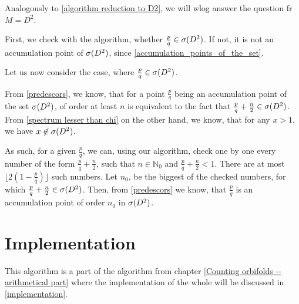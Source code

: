 Analogously to \ref{algorithm reduction to D2}, we will wlog answer the question fr $ M = D^2$. 

First, we check with the algorithm, whether $\frac{p}{q} \in {{\sigma}(D^2)}$. If not, it is not 
an accumulation point of ${{\sigma}(D^2)}$, since \ref{accumulation_points_of_the_set}.

Let us now consider the case, where $\frac{p}{q} \in {{\sigma}(D^2)}$.

From \ref{predescors}, we know, that for a point $\frac{p}{q}$ being an accumulation 
point of the set ${{\sigma}(D^2)}$, of order at least $n$ is equivalent to the fact that 
$\frac{p}{q} + \frac{n}{2} \in {{\sigma}(D^2)}$. From \ref{spectrum lesser than chi} 
on the other hand, we know, that 
for any $x > 1$, we have $x \not\in {{\sigma}(D^2)}$.

  
As such, for a given $\frac{p}{q}$, we can, using our algorithm, check one by one 
every number of the form $\frac{p}{q} + \frac{n}{2}$, such that $n \in \mathbb{N}_0$ and 
$\frac{p}{q} + \frac{n}{2} < 1$. There are at most 
$\lfloor 2 \left(1 -\frac{p}{q} \right)\rfloor$ such numbers. 
Let $n_0$, be the biggest of the checked numbers, for which 
$\frac{p}{q} + \frac{n}{2} \in {{\sigma}(D^2)}$. 
Then, from \ref{predescors} 
we know, that $\frac{p}{q}$ is an accumulation point of order $n_0$ in ${{\sigma}(D^2)}$. 

 





\section{Implementation}
This algorithm is a part of the algorithm from chapter \ref{Counting orbifolds -- arithmetical part} 
where the implementation of the whole will be discussed in \ref{implementation}.
